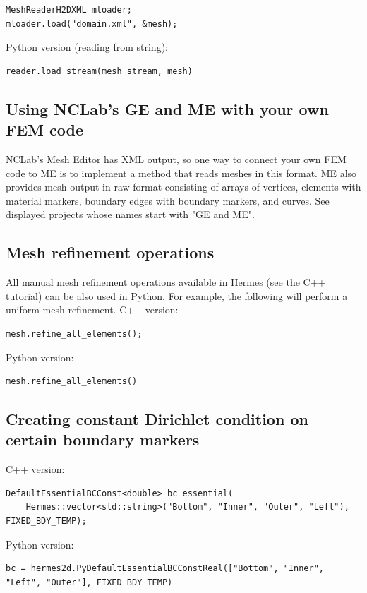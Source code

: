 \documentclass{article}
\begin{document}
{\small
\begin{verbatim}
MeshReaderH2DXML mloader;  
mloader.load("domain.xml", &mesh);
\end{verbatim}
}
\noindent
Python version (reading from string):
{\small
\begin{verbatim}
reader.load_stream(mesh_stream, mesh)
\end{verbatim}
}

\subsection*{Using NCLab's GE and ME with your own FEM code}

NCLab's Mesh Editor has XML output, so one way to connect your 
own FEM code to ME is to implement a method that reads 
meshes in this format. ME also provides mesh output in raw format
consisting of arrays of vertices, elements with material markers, 
boundary edges with boundary markers, and curves. See displayed 
projects whose names start with "GE and ME". 


\subsection*{Mesh refinement operations}

All manual mesh refinement operations available in Hermes (see the C++ tutorial)
can be also used in Python. For example, the following will perform a uniform 
mesh refinement. C++ version:

{\small
\begin{verbatim}
mesh.refine_all_elements();
\end{verbatim}
}
\noindent
Python version:

{\small
\begin{verbatim}
mesh.refine_all_elements()
\end{verbatim}
}

\subsection*{Creating constant Dirichlet condition on certain boundary markers}

C++ version:
{\small
\begin{verbatim}
DefaultEssentialBCConst<double> bc_essential(
    Hermes::vector<std::string>("Bottom", "Inner", "Outer", "Left"), FIXED_BDY_TEMP);
\end{verbatim}
}
\noindent
Python version:

{\small
\begin{verbatim}
bc = hermes2d.PyDefaultEssentialBCConstReal(["Bottom", "Inner", "Left", "Outer"], FIXED_BDY_TEMP)
\end{verbatim}
}
\end{document}
